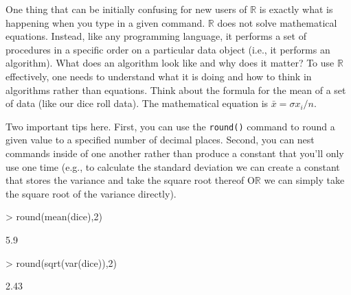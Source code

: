 \documentclass[12pt]{article}
\begin{document}
One thing that can be initially confusing for new users of $\mathbb{R}$ is exactly what is happening when you type in a given command. $\mathbb{R}$ does not solve mathematical equations. Instead, like any programming language, it performs a set of procedures in a specific order on a particular data object (i.e., it performs an algorithm). What does an algorithm look like and why does it matter? To use $\mathbb{R}$ effectively, one needs to understand what it is doing and how to think in algorithms rather than equations. Think about the formula for the mean of a set of data (like our dice roll data). The mathematical equation is $\bar{x}=\sigma x_{i} / n$.



Two important tips here. First, you can use the \verb|round()| command to round a given value to a specified number of decimal places. Second, you can nest commands inside of one another rather than produce a constant that you'll only use one time (e.g., to calculate the standard deviation we can create a constant that stores the variance and take the square root thereof O$\mathbb{R}$ we can simply take the square root of the variance directly).
\begin{Schunk}
\begin{Sinput}
> round(mean(dice),2)
\end{Sinput}
\begin{Soutput}
[1] 5.9
\end{Soutput}
\begin{Sinput}
> round(sqrt(var(dice)),2)
\end{Sinput}
\begin{Soutput}
[1] 2.43
\end{Soutput}
\end{Schunk}
\end{document}
